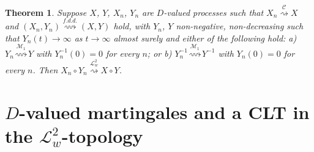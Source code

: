 \documentclass[final]{amsart}
\newtheorem{thm}{Theorem}[section]
\theoremstyle{definition}
\numberwithin{equation}{section}
\newcommand{\cC}{\ensuremath{\mathcal{C}}}
\newcommand{\cL}{\ensuremath{\mathcal{L}}}
\newcommand{\cM}{\ensuremath{\mathcal{M}}}
\begin{document}
\begin{thm}\label{thm:comp}
Suppose $X$, $Y$, $X_n$, $Y_n$ are $D$-valued processes such that
$X_n\stackrel{\cC}{\rightsquigarrow} X$ and $(X_n,Y_n) \stackrel{f.d.d.}{\rightsquigarrow} (X,Y)$ hold,
with $Y_n$, $Y$ non-negative, non-decreasing such that $Y_n(t) \to\infty$ as $t\to\infty$ almost surely
and either of the following hold:
a) $Y_n \stackrel{\cM_1}{\rightsquigarrow} Y$ with $Y_n^{-1}(0)=0$ for every $n$; or
b) $Y_n^{-1} \stackrel{\cM_1}{\rightsquigarrow} Y^{-1}$ with $Y_n(0)=0$ for every $n$.
Then $X_n\circ Y_n \stackrel{\cL^2_w}{\rightsquigarrow} X\circ Y$.
\end{thm}




\section{$D$-valued martingales and a CLT in the $\cL^2_w$-topology}\label{sec:m1_clt}
\end{document}
